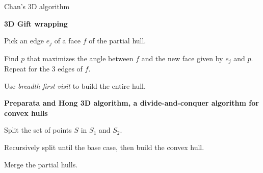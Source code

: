 \documentclass[14pt]{beamer}
\begin{document}
\begin{frame}{Chan's 3D algorithm}
	\begin{center}
		\begin{fullpageitemize}
			\item<1->[\rtarrow] \textbf{3D Gift wrapping}
			\fontsize{12}{14}\notosansfont
			\begin{sublist}
				\item<2-> Pick an edge $e_j$ of a face $f$ of the partial hull. 
				\item<3-> Find $p$ that maximizes the angle between $f$ and the new face given by $e_j$ and $p$. Repeat for the 3 edges of $f$.
				\item<4-> Use \textit{breadth first visit} to build the entire hull.
			\end{sublist}
			
			\item<5->[\rtarrow] \textbf{Preparata and Hong 3D algorithm, a divide-and-conquer algorithm for convex hulls}	
			\fontsize{12}{14}\notosansfont
			\begin{sublist}
				\item<6-> Split the set of points $S$ in $S_1$ and $S_2$.
				\item<7-> Recursively split until the base case, then build the convex hull.
				\item<8-> Merge the partial hulls.
			\end{sublist}
		\end{fullpageitemize}
	\end{center}
\end{frame}
\end{document}
